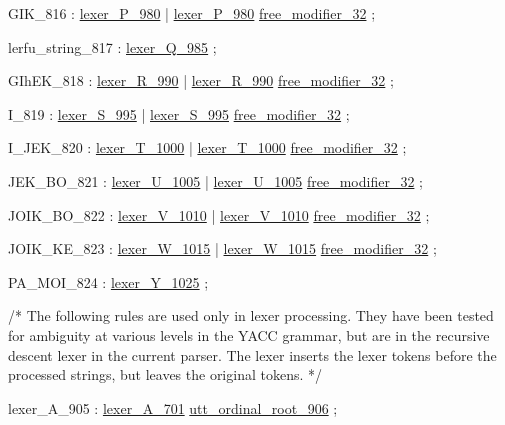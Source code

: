 \label{html:y816}
GIK_816                 :  \hyperref[html:y980]{lexer_P_980}
                        |  \hyperref[html:y980]{lexer_P_980}  \hyperref[html:y32]{free_modifier_32}
                        ;

\label{html:y817}
lerfu_string_817        :  \hyperref[html:y985]{lexer_Q_985}
                        ;

\label{html:y818}
GIhEK_818               :  \hyperref[html:y990]{lexer_R_990}
                        |  \hyperref[html:y990]{lexer_R_990}  \hyperref[html:y32]{free_modifier_32}
                        ;

\label{html:y819}
I_819                   :  \hyperref[html:y995]{lexer_S_995}
                        |  \hyperref[html:y995]{lexer_S_995}  \hyperref[html:y32]{free_modifier_32}
                        ;

\label{html:y820}
I_JEK_820               :  \hyperref[html:y1000]{lexer_T_1000}
                        |  \hyperref[html:y1000]{lexer_T_1000}  \hyperref[html:y32]{free_modifier_32}
                        ;

\label{html:y821}
JEK_BO_821              :  \hyperref[html:y1005]{lexer_U_1005}
                        |  \hyperref[html:y1005]{lexer_U_1005}  \hyperref[html:y32]{free_modifier_32}
                        ;

\label{html:y822}
JOIK_BO_822             :  \hyperref[html:y1010]{lexer_V_1010}
                        |  \hyperref[html:y1010]{lexer_V_1010}  \hyperref[html:y32]{free_modifier_32}
                        ;

\label{html:y823}
JOIK_KE_823             :  \hyperref[html:y1015]{lexer_W_1015}
                        |  \hyperref[html:y1015]{lexer_W_1015}  \hyperref[html:y32]{free_modifier_32}
                        ;

\label{html:y824}
PA_MOI_824              :  \hyperref[html:y1025]{lexer_Y_1025}
                        ;

/* The following rules are used only in lexer processing.  They have been
   tested for ambiguity at various levels in the YACC grammar, but are in
   the recursive descent lexer in the current parser.  The lexer inserts
   the lexer tokens before the processed strings, but leaves the original
   tokens.  */

\label{html:y905}
lexer_A_905             :  \hyperref[html:y701]{lexer_A_701}  \hyperref[html:y906]{utt_ordinal_root_906}
                        ;

